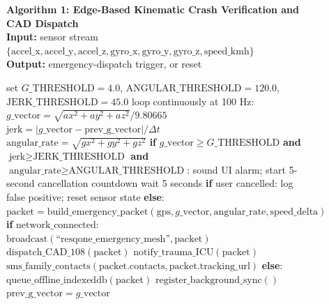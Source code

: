 \documentclass[conference]{IEEEtran}
\begin{document}
\begin{figure}[htbp]
\begin{minipage}{0.98\columnwidth}
\small
\textbf{Algorithm 1: Edge-Based Kinematic Crash Verification and CAD Dispatch} \\
\textbf{Input:} sensor stream $\{\text{accel\_x}, \text{accel\_y}, \text{accel\_z}, \text{gyro\_x}, \text{gyro\_y}, \text{gyro\_z}, \text{speed\_kmh}\}$ \\
\textbf{Output:} emergency-dispatch trigger, or reset
\begin{algorithmic}[1]
\STATE set $G\_\text{THRESHOLD} = 4.0$, $\text{ANGULAR\_THRESHOLD} = 120.0$, $\text{JERK\_THRESHOLD} = 45.0$
\STATE loop continuously at 100 Hz:
\STATE \quad $g\_\text{vector} = \sqrt{ax^2 + ay^2 + az^2} / 9.80665$
\STATE \quad $\text{jerk} = |g\_\text{vector} - \text{prev\_g\_vector}| / \Delta t$
\STATE \quad $\text{angular\_rate} = \sqrt{gx^2 + gy^2 + gz^2}$
\STATE \quad \textbf{if} $g\_\text{vector} \ge G\_\text{THRESHOLD}$ \textbf{and} $\text{jerk} \ge \text{JERK\_THRESHOLD}$ \textbf{and} $\text{angular\_rate} \ge \text{ANGULAR\_THRESHOLD}$:
\STATE \quad \quad sound UI alarm; start 5-second cancellation countdown
\STATE \quad \quad wait 5 seconds
\STATE \quad \quad \textbf{if} user cancelled:
\STATE \quad \quad \quad log false positive; reset sensor state
\STATE \quad \quad \textbf{else}:
\STATE \quad \quad \quad $\text{packet} = \text{build\_emergency\_packet}(\text{gps}, g\_\text{vector}, \text{angular\_rate}, \text{speed\_delta})$
\STATE \quad \quad \quad \textbf{if} $\text{network\_connected}$:
\STATE \quad \quad \quad \quad $\text{broadcast}(\text{``resqone\_emergency\_mesh''}, \text{packet})$
\STATE \quad \quad \quad \quad $\text{dispatch\_CAD\_108}(\text{packet})$
\STATE \quad \quad \quad \quad $\text{notify\_trauma\_ICU}(\text{packet})$
\STATE \quad \quad \quad \quad $\text{sms\_family\_contacts}(\text{packet.contacts}, \text{packet.tracking\_url})$
\STATE \quad \quad \quad \textbf{else}:
\STATE \quad \quad \quad \quad $\text{queue\_offline\_indexeddb}(\text{packet})$
\STATE \quad \quad \quad \quad $\text{register\_background\_sync}()$
\STATE \quad $\text{prev\_g\_vector} = g\_\text{vector}$
\end{algorithmic}
\end{minipage}
\end{figure}
\end{document}
